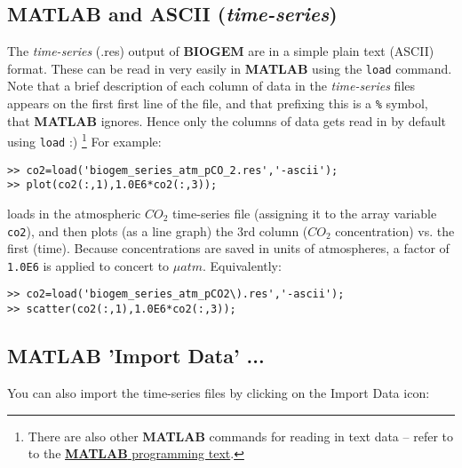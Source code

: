 \documentclass[11pt,fleqn]{book} %
\begin{document}

\subsection{MATLAB and ASCII (\textit{time-series})}

The \textit{time-series} (\textsf{\footnotesize .res}) output of \textbf{BIOGEM} are in a simple plain text (ASCII) format. These can be read in very easily in \textbf{MATLAB} using the \texttt{load} command. Note that a brief description of each column of data in the \textit{time-series} files appears on the first first line of the file, and that prefixing this is a \texttt{\%} symbol, that \textbf{MATLAB} ignores. Hence only the columns of data gets read in by default using \texttt{load} :) \footnote{There are also other \textbf{MATLAB} commands for reading in text data -- refer to to the \href{http://www.seao2.info//teaching/201718.GEO111/GEO111.pdf}{\textbf{MATLAB} programming text}.} For example:

\small\begin{verbatim}
>> co2=load('biogem_series_atm_pCO_2.res','-ascii');
>> plot(co2(:,1),1.0E6*co2(:,3));
\end{verbatim}\normalsize

\noindent loads in the atmospheric \(CO_{2}\) time-series file (assigning it to the array variable \texttt{co2}), and then plots (as a line graph) the 3rd column (\(CO_{2}\) concentration) vs. the first (time). Because concentrations are saved in units of atmospheres, a factor of \texttt{1.0E6} is applied to concert to \(\mu atm\). Equivalently:

\small\begin{verbatim}
>> co2=load('biogem_series_atm_pCO2\).res','-ascii');
>> scatter(co2(:,1),1.0E6*co2(:,3));
\end{verbatim}\normalsize


\subsection{MATLAB 'Import Data' ...}

You can also import the time-series files by clicking on the \footnotesize\textsf{Import Data }\normalsize icon:
\end{document}
